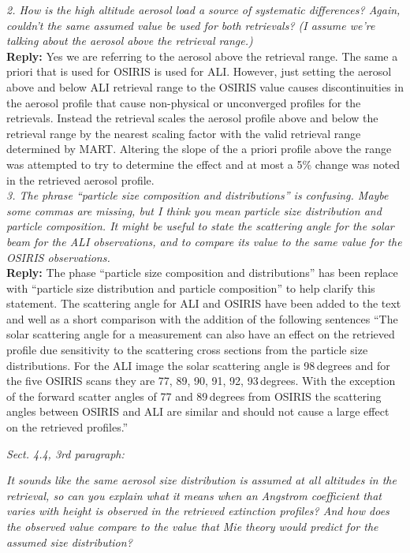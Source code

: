 \documentclass[12pt, notitlepage]{article}
\begin{document}
\textit{2. How is the high altitude aerosol load a source of systematic differences? Again,
couldn't the same assumed value be used for both retrievals? (I assume we're talking
about the aerosol above the retrieval range.)}\\

\textbf{Reply:} Yes we are referring to the aerosol above the retrieval range. The same a priori that is used for OSIRIS is used for ALI. However, just setting the aerosol above and below ALI retrieval range to the OSIRIS value causes discontinuities in the aerosol profile that cause non-physical or unconverged profiles for the retrievals. Instead the retrieval scales the aerosol profile above and below the retrieval range by the nearest scaling factor with the valid retrieval range determined by MART. Altering the slope of the a priori profile above the range was attempted to try to determine the effect and at most a 5\% change was noted in the retrieved aerosol profile.\\

\textit{3. The phrase ``particle size composition and distributions'' is confusing. Maybe some
commas are missing, but I think you mean particle size distribution and particle composition.
It might be useful to state the scattering angle for the solar beam for the ALI observations,
and to compare its value to the same value for the OSIRIS observations.}\\

\textbf{Reply:} The phase ``particle size composition and distributions'' has been replace with ``particle size distribution and particle composition'' to help clarify this statement. The scattering angle for ALI and OSIRIS have been added to the text and well as a short comparison with the addition of the following sentences ``The solar scattering angle for a measurement can also have an effect on the retrieved profile due sensitivity to the scattering cross sections from the particle size distributions. For the ALI image the solar scattering angle is 98\,degrees and for the five OSIRIS scans they are 77, 89, 90, 91, 92, 93\,degrees. With the exception of the forward scatter angles of 77 and 89\,degrees from OSIRIS the scattering angles between OSIRIS and ALI are similar and should not cause a large effect on the retrieved profiles.''\\

\hrulefill

\textit{Sect. 4.4, 3rd paragraph:}

\textit{It sounds like the same aerosol size distribution is assumed at all altitudes in the retrieval,
so can you explain what it means when an Angstrom coefficient that varies with
height is observed in the retrieved extinction profiles? And how does the observed
value compare to the value that Mie theory would predict for the assumed size distribution?}\\
\end{document}
